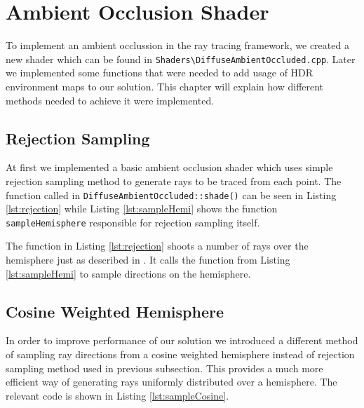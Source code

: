 \section{Ambient Occlusion Shader}

To implement an ambient occlussion in the ray tracing framework, we created a new shader which can be found in  \texttt{Shaders\textbackslash{}DiffuseAmbientOccluded.cpp}. Later we implemented some functions that were needed to add usage of HDR environment maps to our solution. This chapter will explain how different  methods needed to achieve it were implemented.  


\subsection{Rejection Sampling}
At first we implemented a basic ambient occlusion shader which uses simple rejection sampling method to generate rays 			to be traced from each point. The function called in \texttt{DiffuseAmbientOccluded::shade()} can be seen in Listing 		\autoref{lst:rejection} while Listing \autoref{lst:sampleHemi} shows the function \texttt{sampleHemisphere} responsible for rejection sampling itself. 



The function in Listing \autoref{lst:rejection} shoots a number of rays over the hemisphere just as described in \cite{Gems17}. It calls the function from Listing \autoref{lst:sampleHemi} to sample directions on the hemisphere.



\subsection{Cosine Weighted Hemisphere}
In order to improve performance of our solution we introduced a different method of sampling ray directions from a cosine weighted hemisphere instead of rejection sampling method used in previous subsection. This provides a much more efficient way of generating rays uniformly distributed over a hemisphere. The relevant code is shown in Listing \autoref{lst:sampleCosine}.



